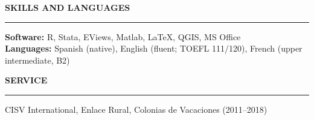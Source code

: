 \documentclass[11pt,letterpaper]{article}
\renewcommand{\section}[1]{%
  \vspace{0.8em}%
  {\large\bfseries\MakeUppercase{#1}}%
  \vspace{0.3em}%
  \hrule%
  \vspace{0.4em}%
}
\begin{document}

\section{Skills and Languages}

\textbf{Software:} R, Stata, EViews, Matlab, \LaTeX, QGIS, MS Office \\
\textbf{Languages:} Spanish (native), English (fluent; TOEFL 111/120), French (upper intermediate, B2)


\section{Service}

CISV International, Enlace Rural, Colonias de Vacaciones (2011--2018)
\end{document}
